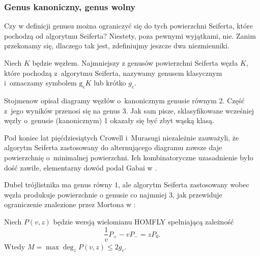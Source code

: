 
\subsubsection{Genus kanoniczny, genus wolny}
Czy w definicji genusu można ograniczyć się do tych powierzchni Seiferta, które pochodzą od algorytmu Seiferta?
%
Niestety, poza pewnymi wyjątkami, nie.
Zanim przekonamy się, dlaczego tak jest, zdefiniujmy jeszcze dwa niezmienniki.

\begin{definition}
%
    Niech $K$ będzie węzłem.
    Najmniejszy z genusów powierzchni Seiferta węzła $K$, które pochodzą z~algorytmu Seiferta, nazywamy genusem klasycznym i~oznaczamy symbolem $\operatorname{g_c} K$ lub krótko $g_c$.
\end{definition}

Stojmenow \cite{stoimenow08} opisał diagramy węzłów o~kanonicznym genusie równym 2.
%
Część z~jego wyników przenosi się na genus 3.
Jak sam pisze, sklasyfikowane wcześniej węzły o~genusie (kanonicznym) 1 okazały się być zbyt wąską klasą.

Pod koniec lat pięćdziesiątych Crowell i~Murasugi niezależnie zauważyli, że algorytm Seiferta zastosowany do alternującego diagramu zawsze daje powierzchnię o~minimalnej powierzchni.
%
%
Ich kombinatoryczne uzasadnienie było dość zawiłe, elementarny dowód podał Gabai w \cite{gabai86}.
%

Dubel trójlistnika ma genus równy $1$, ale algorytm Seiferta zastosowany wobec węzła produkuje powierzchnie o genusie co najmniej $3$, jak przewiduje ograniczenie znalezione przez Mortona w \cite[twierdzenie 2]{morton86}:
%

\begin{proposition}
    Niech $P(v, z)$ będzie wersją wielomianu HOMFLY spełniającą zależność
    \begin{equation}
        \frac 1v P_+ - vP_- = zP_0.
    \end{equation}
    Wtedy $M = \max \deg_z P(v, z) \le 2g_c$.
%
\end{proposition}

